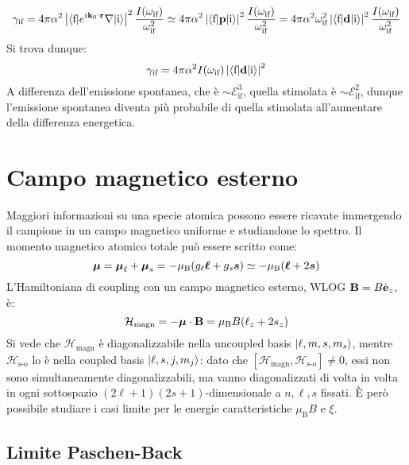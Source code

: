 \begin{equation*}
	\gamma_\text{if} = 4\pi \alpha^2 \left\lvert\braket{\text{f} | e^{i \mathbf{k}_0 \cdot \mathbf{r}} \nabla | \text{i}}\right\rvert^2 \frac{I(\omega_\text{if})}{\omega_\text{if}^2} \simeq 4\pi \alpha^2 \left\lvert\braket{\text{f} | \mathbf{p} | \text{i}}\right\rvert^2 \frac{I(\omega_\text{if})}{\omega_\text{if}^2} = 4\pi \alpha^2 \omega_\text{if}^2 \left\lvert\braket{\text{f} | \mathbf{d} | \text{i}}\right\rvert^2 \frac{I(\omega_\text{if})}{\omega_\text{if}^2}
\end{equation*}
Si trova dunque:
\begin{equation}
	\gamma_\text{if} = 4\pi \alpha^2 I(\omega_\text{if}) \left\lvert\braket{\text{f} | \mathbf{d} | \text{i}}\right\rvert^2
\end{equation}
A differenza dell'emissione spontanea, che è $ \sim \mathcal{E}_\text{if}^3 $, quella stimolata è $ \sim \mathcal{E}_\text{if}^2 $, dunque l'emissione spontanea diventa più probabile di quella stimolata all'aumentare della differenza energetica.

\section{Campo magnetico esterno}

Maggiori informazioni su una specie atomica possono essere ricavate immergendo il campione in un campo magnetico uniforme e studiandone lo spettro. Il momento magnetico atomico totale può essere scritto come:
\begin{equation}
	\boldsymbol{\mu} = \boldsymbol{\mu}_\ell + \boldsymbol{\mu}_s = - \mu_\text{B} ( g_\ell \boldsymbol{\ell} + g_s \boldsymbol{s}) \simeq - \mu_\text{B} (\boldsymbol{\ell} + 2 \boldsymbol{s})
\end{equation}
L'Hamiltoniana di coupling con un campo magnetico esterno, WLOG $ \mathbf{B} = B \hat{\mathbf{e}}_z $, è:
\begin{equation}
	\mathcal{H}_\text{magn} = - \boldsymbol{\mu} \cdot \mathbf{B} = \mu_\text{B} B (\ell_z + 2s_z)
\end{equation}
Si vede che $ \mathcal{H}_\text{magn} $ è diagonalizzabile nella uncoupled basis $ \ket{\ell, m, s, m_s} $, mentre $ \mathcal{H}_\text{s-o} $ lo è nella coupled basis $ \ket{\ell, s, j, m_j} $: dato che $ [\mathcal{H}_\text{magn} , \mathcal{H}_\text{s-o}] \neq 0 $, essi non sono simultaneamente diagonalizzabili, ma vanno diagonalizzati di volta in volta in ogni sottospazio $ (2\ell + 1)(2s + 1) $-dimensionale a $ n,\ell,s $ fissati.
È però possibile studiare i casi limite per le energie caratteristiche $ \mu_\text{B} B $ e $ \xi $.

\subsection{Limite Paschen-Back}

